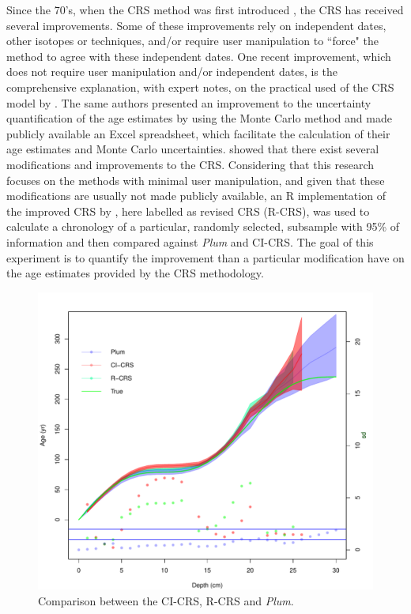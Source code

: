 \documentclass [10pt] {article}
\begin{document}
Since the 70's, when the CRS method was first introduced \citep{Appleby1978,Robbins1978}, the CRS has received several improvements. 
Some of these improvements rely on independent dates, other isotopes or techniques, and/or require user manipulation to ``force" the method to agree with these independent dates.
One recent improvement, which does not require user manipulation and/or independent dates, is the comprehensive explanation, with expert notes, on the practical used of the CRS model by \citet{Sanchez-Cabeza2012}. 
The same authors presented an improvement to the uncertainty quantification of the age estimates by using the Monte Carlo method \citep{Sanchez-Cabeza2014}
and made publicly available an Excel spreadsheet, which facilitate the calculation of their age estimates and Monte Carlo uncertainties. 
\citet{Barsanti2020} showed that there exist several modifications and improvements to the CRS. 
Considering that this research focuses on the methods with minimal user manipulation, and given that these modifications are usually not made publicly available, an R implementation of the improved CRS by \citet{Sanchez-Cabeza2014}, here labelled as revised CRS (R-CRS), was used to calculate a chronology of a particular, randomly selected, subsample with 95\% of information and then compared against \textit{Plum} and CI-CRS.
The goal of this experiment is to quantify the improvement than a particular modification have on the age estimates provided by the CRS methodology.

\begin{figure}[h!]
 \centering
  \includegraphics[width=.95\linewidth]{95Comparison.pdf}
	\caption{Comparison between the CI-CRS, R-CRS and \textit{Plum}.} 
  \label{fig:95compa}
\end{figure}
\end{document}
